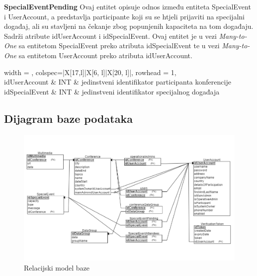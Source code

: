                 \vspace{8mm}


                \textbf{SpecialEventPending} Ovaj entitet opisuje odnos između entiteta SpecialEvent i UserAccount, a predstavlja participante koji su se htjeli prijaviti na specijalni događaj, ali su stavljeni na čekanje zbog popunjenih kapaciteta na tom događaju. Sadrži atribute idUserAccount i idSpecialEvent.  Ovaj entitet je u vezi \textit{Many-to-One} sa entitetom SpecialEvent preko atributa idSpecialEvent te u vezi \textit{Many-to-One} sa entitetom UserAccount preko atributa idUserAccount.
				
				\begin{longtblr}[
					label=none,
					entry=none
					]{
						width = \textwidth,
						colspec={|X[17,l]|X[6, l]|X[20, l]|}, 
						rowhead = 1,
					} %
					\hline {}	 \\ \hline[3pt]
					idUserAccount & INT	&  	jedinstveni identifikator participanta konferencije  	\\ \hline
					idSpecialEvent	& INT &   jedinstveni identifikator specijalnog događaja   	\\ \hline
				\end{longtblr}

                \vspace{8mm}
				
				
				
				
			\subsection{Dijagram baze podataka}
				\begin{figure}[H]
			\includegraphics[scale=0.85]{slike/RelModel.PNG} %
			\centering
			\caption{Relacijski model baze}
			\label{fig:promjene}
		\end{figure}
			
